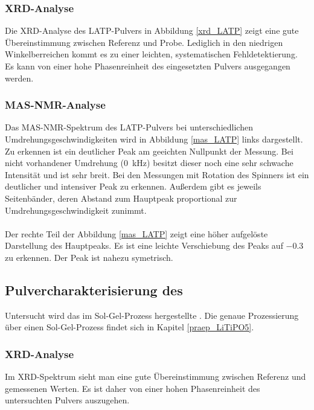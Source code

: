 \documentclass[a4paper, 11pt, headsepline,footsepline,twoside,abstract]{scrbook}
\begin{document}
\subsubsection{XRD-Analyse}
Die XRD-Analyse des LATP-Pulvers in Abbildung \ref{xrd_LATP} zeigt eine gute Übereinstimmung zwischen Referenz und Probe. Lediglich in den niedrigen Winkelberreichen kommt es zu einer leichten, systematischen Fehldetektierung. Es kann von einer hohe Phasenreinheit des eingesetzten Pulvers ausgegangen werden.
\subsubsection{MAS-NMR-Analyse}
Das MAS-NMR-Spektrum des LATP-Pulvers bei unterschiedlichen Umdrehungsgeschwindigkeiten wird in Abbildung \ref{mas_LATP} links dargestellt. Zu erkennen ist ein deutlicher Peak am geeichten Nullpunkt der Messung. Bei nicht vorhandener Umdrehung (\SI{0}{\kilo\hertz}) besitzt dieser noch eine sehr schwache Intensität und ist sehr breit. Bei den Messungen mit Rotation des Spinners ist ein deutlicher und intensiver Peak zu erkennen. Außerdem gibt es jeweils Seitenbänder, deren Abstand zum Hauptpeak proportional zur Umdrehungsgeschwindigkeit zunimmt.
\\\\
Der rechte Teil der Abbildung \ref{mas_LATP} zeigt eine höher aufgelöste Darstellung des Hauptpeaks. Es ist eine leichte Verschiebung des Peaks auf \SI{-0.3}{\nmrppm} zu erkennen. Der Peak ist nahezu symetrisch. 
\subsection{Pulvercharakterisierung des }
Untersucht wird das im Sol-Gel-Prozess hergestellte . Die genaue Prozessierung über einen Sol-Gel-Prozess findet sich in Kapitel \ref{praep_LiTiPO5}.
\subsubsection{XRD-Analyse}
Im XRD-Spektrum sieht man eine gute Übereinstimmung zwischen Referenz und gemessenen Werten. Es ist daher von einer hohen Phasenreinheit des untersuchten Pulvers auszugehen.
\end{document}

